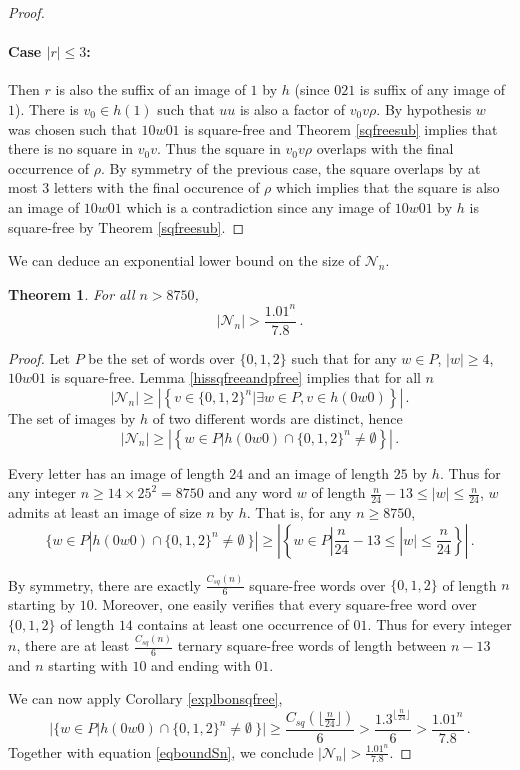 \documentclass[a4paper,12pt]{article}
\newtheorem{theorem}{Theorem}
\newcommand{\pal}{\rho}
\begin{document}
\begin{proof}
 \paragraph{Case $|r|\le3$:}
 Then $r$ is also the suffix of an image of $1$ by $h$ (since $021$ is suffix of any image of $1$). 
There is $v_0\in h(1)$ such that $uu$ is also a factor of $v_0v\pal$. By hypothesis $w$ was chosen such that $10w01$ is square-free and Theorem \ref{sqfreesub} implies that there is no square in $v_0v$. Thus the square in $v_0v\pal$ overlaps with the final occurrence of $\pal$. By symmetry of the previous case, the square overlaps by at most $3$ letters with the final occurence of $\pal$ which implies that the square is also an image of $10w01$ which is a contradiction since any image of $10w01$ by $h$ is square-free by Theorem \ref{sqfreesub}.
\end{proof}
We can deduce an exponential lower bound on the size of $\mathcal{N}_n$. 

\begin{theorem}\label{expboundsqpfree}
 For all $n>8750$,
 $$|\mathcal{N}_n|> \frac{1.01^{n}}{7.8}\,.$$
\end{theorem}
\begin{proof}
Let $P$ be the set of words over $\{0,1,2\}$ such that for any $w\in P$,  $|w|\ge4$, $10w01$ is square-free.
Lemma \ref{hissqfreeandpfree} implies that for all $n$
 $$|\mathcal{N}_n|\ge \left|\left\{v\in \{0,1,2\}^n | \exists w \in P, v\in h(0w0) \right\}\right|\,.$$
The set of images by $h$ of two different words are distinct, hence
\begin{equation}
|\mathcal{N}_n|\ge \left|\left\{ w \in P|h(0w0)\cap\{0,1,2\}^n\not=\emptyset \right\}\right|\,.\label{eqboundSn}
\end{equation}

Every letter has an image of length $24$ and an image of length $25$ by $h$. Thus for any integer $n\ge 14\times 25^2=8750$ and any word $w$ of length $\frac{n}{24}-13\le|w|\le\frac{n}{24}$, $w$ admits at least an image of size $n$ by $h$.
That is, for any  $n\ge 8750$,
$$\{ w \in P|h(0w0)\cap\{0,1,2\}^n\not=\emptyset \ \}|\ge
\left|\left\{w\in P|  \frac{n}{24}-13\le|w|\le\frac{n}{24}\right\}\right|\,.$$

 
By symmetry, there are exactly $\frac{C_{sq}(n)}{6}$ square-free words over $\{0,1,2\}$  of length $n$ starting by $10$.
Moreover, one easily verifies that every square-free word over $\{0,1,2\}$ of length $14$ contains at least one occurrence of $01$.
Thus for every integer $n$, there are at least $\frac{C_{sq}(n)}{6}$ ternary square-free words of length between $n-13$ and $n$  starting with $10$ and ending with $01$.


We can now apply Corollary \ref{explbonsqfree},
 $$|\{ w \in P|h(0w0)\cap\{0,1,2\}^n\not=\emptyset \ \}|\ge\frac{C_{sq}(\lfloor\frac{n}{24}\rfloor)}{6}> \frac{1.3^{\lfloor\frac{n}{24}\rfloor}}{6}> \frac{1.01^{n}}{7.8}\,.$$
 Together with equation \eqref{eqboundSn}, we conclude 
 $|\mathcal{N}_n|> \frac{1.01^{n}}{7.8}$.
\end{proof}
\end{document}
